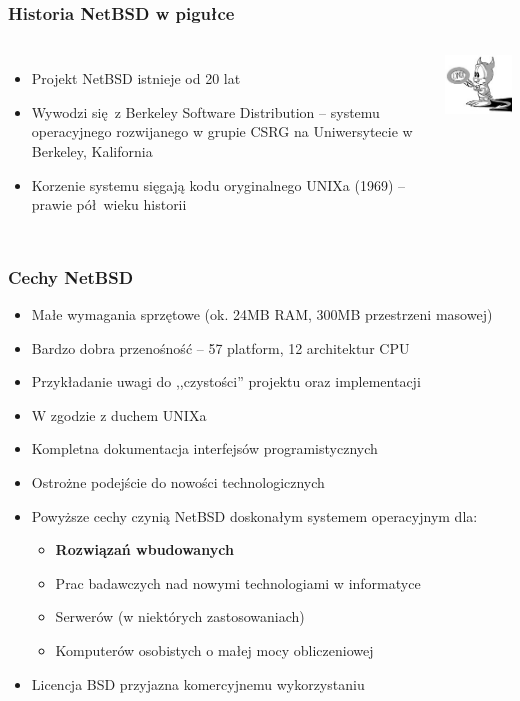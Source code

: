 \documentclass[dvipsnames,table]{beamer}
\begin{document}
\begin{frame}
\frametitle{Historia NetBSD w pigułce}
\begin{columns}[c]
\column{3in}
\begin{itemize}
	\item Projekt NetBSD istnieje od 20 lat
	\item Wywodzi się z Berkeley Software Distribution -- systemu operacyjnego rozwijanego w grupie CSRG na Uniwersytecie w Berkeley, Kalifornia
	\item Korzenie systemu sięgają kodu oryginalnego UNIXa (1969) -- prawie pół wieku historii
\end{itemize}
\column{1in}
\includegraphics[scale=0.5]{img_bsddaemon.jpg}
\end{columns}
\end{frame}

\begin{frame}
\frametitle{Cechy NetBSD}
\begin{itemize}
	\item Małe wymagania sprzętowe (ok. 24MB RAM, 300MB przestrzeni masowej)
	\item Bardzo dobra przenośność -- 57 platform, 12 architektur CPU
	\item Przykładanie uwagi do ,,czystości'' projektu oraz implementacji
	\item W zgodzie z duchem UNIXa
	\item Kompletna dokumentacja interfejsów programistycznych
	\item Ostrożne podejście do nowości technologicznych
	\item Powyższe cechy czynią NetBSD doskonałym systemem operacyjnym dla:
	\begin{itemize}
		\item \textbf{Rozwiązań wbudowanych}
		\item Prac badawczych nad nowymi technologiami w informatyce
		\item Serwerów (w niektórych zastosowaniach)
		\item Komputerów osobistych o małej mocy obliczeniowej
	\end{itemize}
	\item Licencja BSD przyjazna komercyjnemu wykorzystaniu
\end{itemize}
\end{frame}
\end{document}
